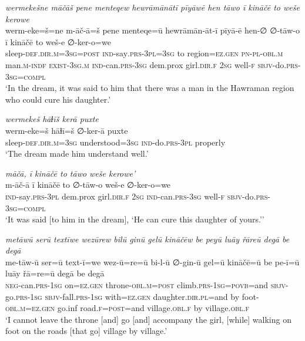 \ea \label{ŽP.154}
\textit{wermekešne māčāš pene menteqew hewrāmānātī pīyāwē hen tāwo ī kināčē to weše kerowe} \\ 
\gll werm-eke=š=ne m-āč-ā=š pene menteqe=ū hewrāmān-āt-ī pīyā-ē hen-∅ ∅-tāw-o ī kināčē to weš-e ∅-ker-o=we \\ 
 sleep\textsc{-def}\textsc{.dir}\textsc{.m}\textsc{=3sg}\textsc{=\textsc{post}} \textsc{ind-}say\textsc{.prs}\textsc{-3pl}\textsc{=3sg} to region=\textsc{ez.gen} \textsc{pn}\textsc{\textsc{-pl}}\textsc{-obl}\textsc{.m} man\textsc{.m}\textsc{-indf} \textsc{exist}\textsc{-3sg}\textsc{.m} \textsc{ind-}can\textsc{.prs}\textsc{-3sg} dem.prox girl\textsc{.dir}\textsc{.f} \textsc{2sg} well\textsc{-f} \textsc{sbjv-}do\textsc{.prs}\textsc{-3sg}\textsc{=compl} \\ 
\glt `In the dream, it was said to him that there was a man in the Hawraman region who could cure his daughter.'
\z 
 
\ea \label{ŽP.155}
\textit{wermekeš hāɫīš kerā puxte} \\ 
\gll werm-eke=š hāɫī=š ∅-ker-ā puxte \\ 
 sleep\textsc{-def}\textsc{.dir}\textsc{.m}\textsc{=3sg} understood\textsc{=3sg} \textsc{ind-}do\textsc{.prs}\textsc{-3pl} properly \\ 
\glt `The dream made him understand well.'
\z 
 
\ea \label{ŽP.156}
\textit{māčā, ī kināčē to tāwo weše kerowe’} \\ 
\gll m-āč-ā ī kināčē to ∅-tāw-o weš-e ∅-ker-o=we \\ 
 \textsc{ind-}say\textsc{.prs}\textsc{-3pl} dem.prox girl\textsc{.dir}\textsc{.f} \textsc{2sg} \textsc{ind-}can\textsc{.prs}\textsc{-3sg} well\textsc{-f} \textsc{sbjv-}do\textsc{.prs}\textsc{-3sg}\textsc{=compl} \\ 
\glt `It was said [to him in the dream], ‘He can cure this daughter of yours.’'
\z 
 
\ea \label{ŽP.161}
\textit{metāwū serū textīwe wezūrew bilū ginū gelū kināčēw be peyū luāy řāreū degā be degā} \\ 
\gll me-tāw-ū ser=ū text-ī=we wez-ū=re=ū bi-l-ū ∅-gin-ū gel=ū kināčē=ū be pe-ī=ū luāy řā=re=ū degā be degā \\ 
 \textsc{neg-}can\textsc{.prs}\textsc{-\textsc{1sg}} on\textsc{\textsc{=ez.gen}} throne\textsc{-obl}\textsc{.m}\textsc{=\textsc{post}} climb\textsc{.prs}\textsc{-\textsc{1sg}}\textsc{=\textsc{povb}}=and \textsc{sbjv-}go\textsc{.prs}\textsc{-\textsc{1sg}} \textsc{sbjv-}fall\textsc{.prs}\textsc{-\textsc{1sg}} with\textsc{\textsc{=ez.gen}} daughter\textsc{.dir}\textsc{.pl}=and by foot\textsc{-obl}\textsc{.m}\textsc{\textsc{=ez.gen}} go.inf road\textsc{.f}\textsc{=\textsc{post}}=and village\textsc{.obl}\textsc{.f} by village\textsc{.obl}\textsc{.f} \\ 
\glt `I cannot leave the throne [and] go [and] accompany the girl, [while] walking on foot on the roads [that go] village by village.'
\z 
 
